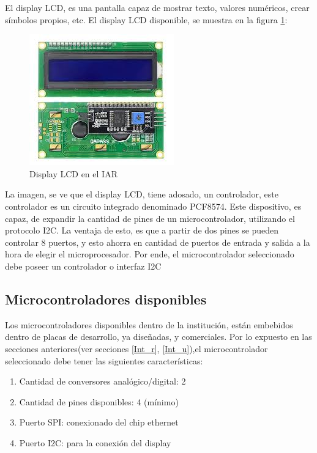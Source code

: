 El display LCD, es una pantalla capaz de mostrar texto, valores numéricos, crear símbolos propios, etc. El display LCD disponible, se muestra en la figura \ref{fig:LCD_r}: 
\begin{figure}[ht]
	\centering
	\includegraphics{dispLCD} 
	\caption{Display LCD en el IAR}
	\label{fig:LCD_r}
\end{figure}

La imagen, se ve que el display LCD, tiene adosado, un controlador, este controlador es un circuito integrado denominado PCF8574. Este dispositivo, es capaz, de expandir la cantidad de pines de un microcontrolador, utilizando el protocolo I2C. La ventaja de esto, es que a partir de dos pines se pueden controlar 8 puertos, y esto ahorra en cantidad de puertos de entrada y salida a la hora de elegir el microprocesador. Por ende, el microcontrolador seleccionado debe poseer un controlador o interfaz I2C   



\subsection{Microcontroladores disponibles}  

Los microcontroladores disponibles dentro de la institución, están embebidos dentro de placas de desarrollo, ya diseñadas, y comerciales. Por lo expuesto en las secciones anteriores(ver secciones \ref{Int_r}, \ref{Int_u}),el microcontrolador seleccionado debe tener las siguientes características:

\begin{enumerate}
	\item Cantidad de conversores analógico/digital: 2
	\item Cantidad de pines disponibles: 4 (mínimo) 
	\item Puerto SPI: conexionado del chip ethernet
	\item Puerto I2C: para la conexión del display 
\end{enumerate}


